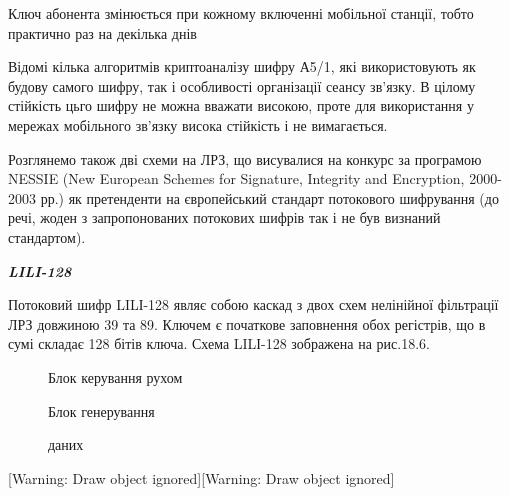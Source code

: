\documentclass[a4paper]{article}
\newcounter{}
\begin{document}
Ключ абонента змінюється при кожному включенні мобільної станції, тобто
практично раз на декілька днів

Відомі кілька алгоритмів криптоаналізу шифру А5/1, які використовують як будову
самого шифру, так і особливості організації сеансу зв’язку. В цілому стійкість
цьго шифру не можна вважати високою, проте для використання у мережах
мобільного зв’язку висока стійкість і не вимагається.

Розглянемо також дві схеми на ЛРЗ, що висувалися на конкурс за програмою NESSIE
(New European Schemes for Signature, Integrity and Encryption, 2000-2003 рр.)
як претенденти на європейський стандарт потокового шифрування (до речі, жоден з
запропонованих потокових шифрів так і не був визнаний стандартом).


\bigskip


\bigskip


\bigskip

{\centering\bfseries\itshape
LILI{}-128
\par}


\bigskip

Потоковий шифр LILІ-128 являє собою каскад з двох схем нелінійної фільтрації ЛРЗ
довжиною 39 та 89. Ключем є початкове заповнення обох регістрів, що в сумі
складає 128 бітів ключа. Схема LILІ-128 зображена на рис.18.6.


\bigskip



\begin{figure}
\centering
\begin{minipage}{1.4583in}
{\centering
Блок керування рухом
\par}
\end{minipage}
\end{figure}
\begin{figure}
\centering
\begin{minipage}{1.9791in}
{\centering
Блок генерування
\par}

{\centering
даних
\par}
\end{minipage}
\end{figure}
[Warning: Draw object ignored][Warning: Draw object ignored]
\end{document}
